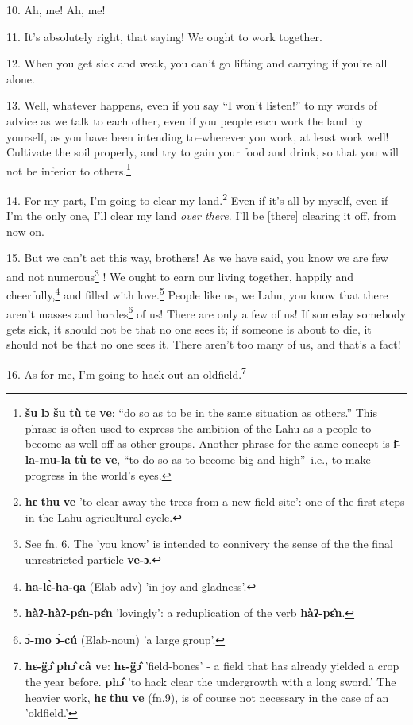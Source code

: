 10. Ah, me! Ah, me!

11. It's absolutely right, that saying! We ought to work together.

12. When you get sick and weak, you can't go lifting and carrying if you're all
alone.

13. Well, whatever happens, even if you say ``I won't listen!''
to my words of advice as we talk to each other, even if you people each work the
land by yourself, as you have been intending to--wherever you work, at least work
well! Cultivate the soil properly, and try to gain your food and drink, so that
you will not be inferior to others.\footnote{\textbf{šu} \textbf{lɔ} \textbf{šu} \textbf{tù} \textbf{te} \textbf{ve}: ``do so as to be in the same situation as others.'' This phrase is often used to express the ambition of the Lahu as a people to become as well off as other groups. Another phrase for the same concept is \textbf{ɨ̄-la-mu-la} \textbf{tù} \textbf{te} \textbf{ve}, ``to do so as to become big and high''--i.e., to make progress in the world's eyes.}

14. For my part, I'm going to clear my land.\footnote{\textbf{hɛ} \textbf{thu} \textbf{ve} 'to clear away the trees from a new field-site': one of the first steps in the Lahu agricultural cycle.} Even if it's all by myself, even
if I'm the only one, I'll clear my land \textit{over there}. I'll be [there] clearing
it off, from now on.

15. But we can't act this way, brothers! As we have said, you know we are few and
not numerous\footnote{See fn. 6. The 'you know' is intended to connivery the sense of the the final unrestricted particle \textbf{ve-ɔ}.} ! We ought to earn our living together, happily and cheerfully,\footnote{\textbf{ha-lɛ̀-ha-qa} (Elab-adv) 'in joy and gladness'.}
and filled with love.\footnote{\textbf{hàʔ-hàʔ-pɛ̂n-pɛ̂n} 'lovingly': a reduplication of the verb \textbf{hàʔ-pɛ̂n}.} People like us, we Lahu, you know that there aren't
masses and hordes\footnote{\textbf{ɔ̀-mo} \textbf{ɔ̀-cú} (Elab-noun) 'a large group'.} of us! There are only a few of us! If someday somebody gets
sick, it should not be that no one sees it; if someone is about to die, it should
not be that no one sees it. There aren't too many of us, and that's a fact!

16. As for me, I'm going to hack out an oldfield.\footnote{\textbf{hɛ-g̈ɔ̂} \textbf{phɔ̂} \textbf{câ} \textbf{ve}: \textbf{hɛ-g̈ɔ̂} 'field-bones' - a field that has already yielded a crop the year before. \textbf{phɔ̂} 'to hack clear the undergrowth with a long sword.' The heavier work, \textbf{hɛ} \textbf{thu} \textbf{ve} (fn.9), is of course not necessary in the case of an 'oldfield.'}


